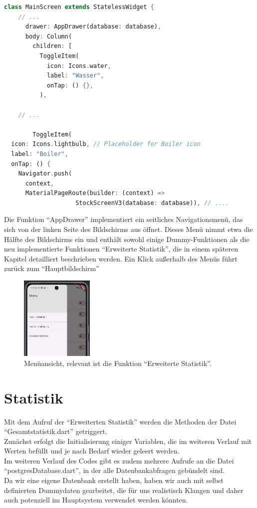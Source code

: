\documentclass[11pt]{scrartcl}
\begin{document}
    \begin{lstlisting}[language=Dart]
class MainScreen extends StatelessWidget {
    // ...
      drawer: AppDrawer(database: database),
      body: Column(
        children: [
          ToggleItem(
            icon: Icons.water,
            label: "Wasser",
            onTap: () {},
          ),

    // ...

        ToggleItem(
  icon: Icons.lightbulb, // Placeholder for Boiler icon
  label: "Boiler",
  onTap: () {
    Navigator.push(
      context,
      MaterialPageRoute(builder: (context) =>
                    StockScreenV3(database: database)), // ....
    \end{lstlisting}
    Die Funktion \enquote{AppDrawer} implementiert ein seitliches Navigationsmenü, das sich von der linken Seite des
    Bildschirms aus öffnet.
    Dieses Menü nimmt etwa die Hälfte des Bildschirms ein und enthält sowohl einige Dummy-Funktionen
    als die neu implementierte Funktionen \enquote{Erweiterte Statistik}, die in einem späteren Kapitel detailliert
    beschrieben werden.
    Ein Klick außerhalb des Menüs führt zurück zum \enquote{Hauptbildschirm}

 \begin{figure}
    \centering
    \includegraphics[height=4cm]{images/MenueScreen}
    \caption{Menüansicht, relevant ist die Funktion \enquote{Erweiterte Statistik}.}
\end{figure}

\newpage

\section*{Statistik}
    Mit dem Aufruf der \enquote{Erweiterten Statistik} werden die Methoden der Datei \enquote{Gesamtstatistik.dart}
    getriggert. \\
    Zunächst erfolgt die Initialisierung einiger Variablen, die im weiteren Verlauf mit Werten befüllt und je nach
    Bedarf wieder geleert werden. \\
    Im weiteren Verlauf des Codes gibt es zudem mehrere Aufrufe an die Datei \enquote{postgresDatabase.dart},
    in der alle Datenbankabfragen gebündelt sind. \\
    Da wir eine eigene Datenbank erstellt haben, haben wir auch mit selbst definierten Dummydaten gearbeitet,
    die für uns realistisch Klangen und daher auch potenziell im Hauptsystem verwendet werden könnten.
\end{document}
